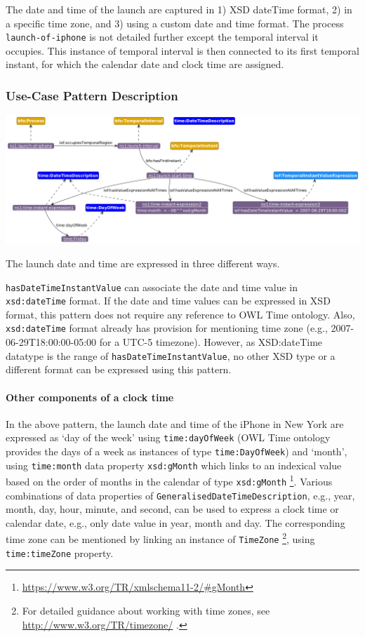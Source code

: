The date and time of the launch are captured in 1) XSD dateTime format, 2) in a specific time zone, and 3) using a custom date and time format. The process \texttt{launch-of-iphone} is not detailed further except the temporal interval it occupies. This instance of temporal interval is then connected to its first temporal instant, for which the calendar date and clock time are assigned.   

\subsubsection*{Use-Case Pattern Description}

\includegraphics[scale=0.35]{scenarios/clock-time-calendar-date/images/uc1-dow-mn.png}

The launch date and time are expressed in three different ways.  

\texttt{hasDateTimeInstantValue} can associate the date and time value in \texttt{xsd:dateTime} format. If the date and time values can be expressed in XSD format, this pattern does not require any reference to OWL Time ontology. Also, \texttt{xsd:dateTime} format already has provision for mentioning time zone (e.g., 2007-06-29T18:00:00-05:00 for a UTC-5 timezone). However, as XSD:dateTime datatype is the range of \texttt{hasDateTimeInstantValue}, no other XSD type or a different format can be expressed using this pattern. 

\paragraph{Other components of a clock time \\}

In the above pattern, the launch date and time of the iPhone in New York are expressed as `day of the week' using \texttt{time:dayOfWeek} (OWL Time ontology provides the days of a week as instances of type \texttt{time:DayOfWeek})  and `month', using \texttt{time:month} data property \texttt{xsd:gMonth} which links to an indexical value based on the order of months in the calendar of type \texttt{xsd:gMonth} \footnote{\url{https://www.w3.org/TR/xmlschema11-2/\#gMonth}}.
Various combinations of data properties of \texttt{GeneralisedDateTimeDescription}, e.g.,  year, month, day, hour, minute, and second, can be used to express a clock time or calendar date, e.g., only date value in year, month and day. The corresponding time zone can be mentioned by linking an instance of \texttt{TimeZone} \footnote{For detailed guidance about working with time zones, see \url{http://www.w3.org/TR/timezone/} .}, using \texttt{time:timeZone} property.       

